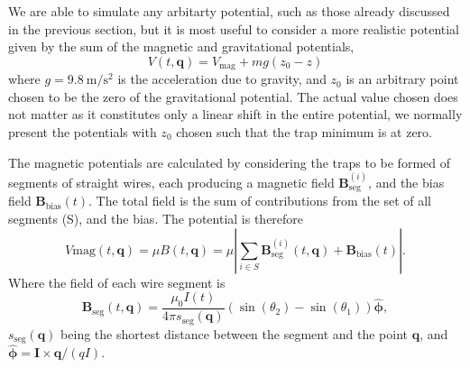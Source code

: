 We are able to simulate any arbitarty potential, such as those already
discussed in the previous section, but it is most useful to consider a more
realistic potential given by the sum of the magnetic and gravitational
potentials,
%
\begin{equation}
  V(t, \mathbf{q}) = V_\text{mag} + mg(z_0-z)
\end{equation}
where $g=\SI{9.8}{\meter\per\second\squared}$ is the acceleration due to
gravity, and $z_0$ is an arbitrary point chosen to be the zero of the
gravitational potential. The actual value chosen does not matter as it
constitutes only a linear shift in the entire potential, we normally present
the potentials with $z_0$ chosen such that the trap minimum is at zero.

The magnetic potentials are calculated by considering the traps to be formed of
segments of straight wires, each producing a magnetic field
$\mathbf{B}_\text{seg}^{(i)}$, and the bias field $\mathbf{B}_\text{bias}(t)$. The total
field is the sum of contributions from the set of all segments (S), and the
bias. The potential is therefore
%
\begin{equation} V\text{mag}(t, \mathbf{q}) = \mu B (t, \mathbf{q}) = \mu \left|
  \sum_{i\in S}
  \mathbf{B}_\text{seg}^{(i)}(t, \mathbf{q}) +
  \mathbf{B}_\text{bias}(t)\right|.
\end{equation}
%
Where the field of each wire segment is~\cite{Griffiths2017}
%
\begin{equation}
  \mathbf{B}_\text{seg}(t, \mathbf{q}) = \frac{\mu_0 I(t)}{4\pi
  s_\text{seg}(\mathbf{q})} (\sin(\theta_2)  -
  \sin(\theta_1))\hat{\mathbf{\phi}},
\label{design:eq:segmentfield}
\end{equation}
%
$s_\text{seg}(\mathbf{q})$ being the shortest distance between the segment
and the point $\mathbf{q}$, and $\hat{\mathbf{\phi}} =
\mathbf{I}\times\mathbf{q}/(qI)$.

